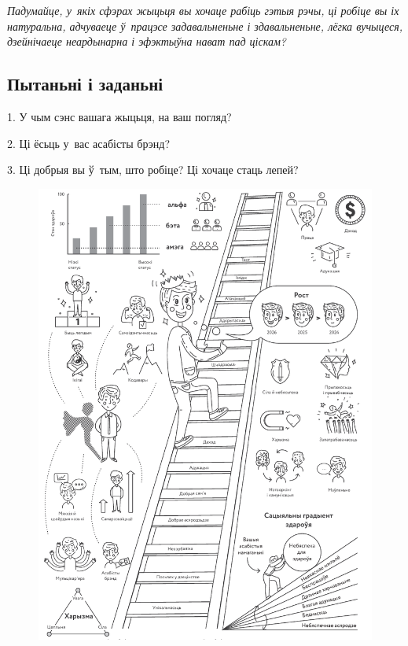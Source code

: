 \emph{Падумайце, у~якіх сфэрах жыцьця вы хочаце рабіць гэтыя рэчы, ці робіце вы іх натуральна, адчуваеце ў~працэсе задавальненьне і здавальненьне, лёгка вучыцеся, дзейнічаеце неардынарна і эфэктыўна нават пад ціскам?}

\subsection*{Пытаньні і заданьні}

1. У чым сэнс вашага жыцьця, на ваш погляд?

2. Ці ёсьць у~вас асабісты брэнд?

3. Ці добрыя вы ў~тым, што робіце? Ці хочаце стаць лепей?

\clearpage
\thispagestyle{empty}
\begin{figure}[htb!]
  \vspace*{-0.15in}
  \includegraphics[width=\textwidth]{willpower/ch9/full.pdf}  
\end{figure}
